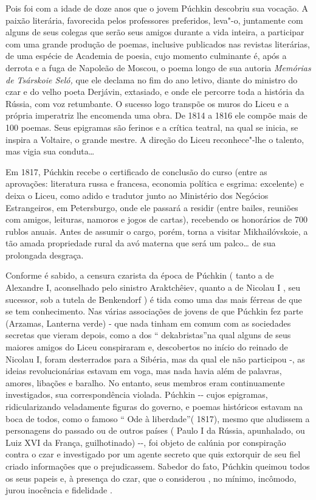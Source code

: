 Pois foi com a idade de doze anos que o jovem Púchkin descobriu sua
vocação. A paixão literária, favorecida pelos professores preferidos,
leva"-o, juntamente com alguns de seus colegas que serão seus amigos
durante a vida inteira, a participar com uma grande produção de poemas,
inclusive publicados nas revistas literárias, de uma espécie de Academia
de poesia, cujo momento culminante é, após a derrota e a fuga de
Napoleão de Moscou, o poema longo de sua autoria \emph{Memórias de
Tsárskoie Seló,} que ele declama no fim do ano letivo, diante do
ministro do czar e do velho poeta Derjávin, extasiado, e onde ele
percorre toda a história da Rússia, com voz retumbante. O sucesso logo
transpõe os muros do Liceu e a própria imperatriz lhe encomenda uma
obra. De 1814 a 1816 ele compõe mais de 100 poemas. Seus epigramas são
ferinos e a crítica teatral, na qual se inicia, se inspira a Voltaire, o
grande mestre. A direção do Liceu reconhece"-lhe o talento, mas vigia sua
conduta\ldots{}

Em 1817, Púchkin recebe o certificado de conclusão do curso (entre as
aprovações: literatura russa e francesa, economia política e esgrima:
excelente) e deixa o Liceu, como adido e tradutor junto ao Ministério
dos Negócios Estrangeiros, em Petersburgo, onde ele passará a residir
(entre bailes, reuniões com amigos, leituras, namoros e jogos de
cartas), recebendo os honorários de 700 rublos anuais. Antes de assumir
o cargo, porém, torna a visitar Mikhailóvskoie, a tão amada propriedade
rural da avó materna que será um palco\ldots{} de sua prolongada desgraça.

Conforme é sabido, a censura czarista da época de Púchkin ( tanto a de
Alexandre I, aconselhado pelo sinistro Araktchêiev, quanto a de Nicolau
I , seu sucessor, sob a tutela de Benkendorf ) é tida como uma das mais
férreas de que se tem conhecimento. Nas várias associações de jovens de
que Púchkin fez parte (Arzamas, Lanterna verde) - que nada tinham em
comum com as sociedades secretas que vieram depois, como a dos ``
dekabristas''na qual alguns de seus maiores amigos do Liceu conspiraram
e, descobertos no início do reinado de Nicolau I, foram desterrados para
a Sibéria, mas da qual ele não participou -, as ideias revolucionárias
estavam em voga, mas nada havia além de palavras, amores, libações e
baralho. No entanto, seus membros eram continuamente investigados, sua
correspondência violada. Púchkin -\/- cujos epigramas, ridicularizando
veladamente figuras do governo, e poemas históricos estavam na boca de
todos, como o famoso `` Ode à liberdade''( 1817), mesmo que aludissem a
personagens do passado ou de outros países ( Paulo I da Rússia,
apunhalado, ou Luiz XVI da França, guilhotinado) -\/-, foi objeto de
calúnia por conspiração contra o czar e investigado por um agente
secreto que quis extorquir de seu fiel criado informações que o
prejudicassem. Sabedor do fato, Púchkin queimou todos os seus papeis e,
à presença do czar, que o considerou , no mínimo, incômodo, jurou
inocência e fidelidade .

